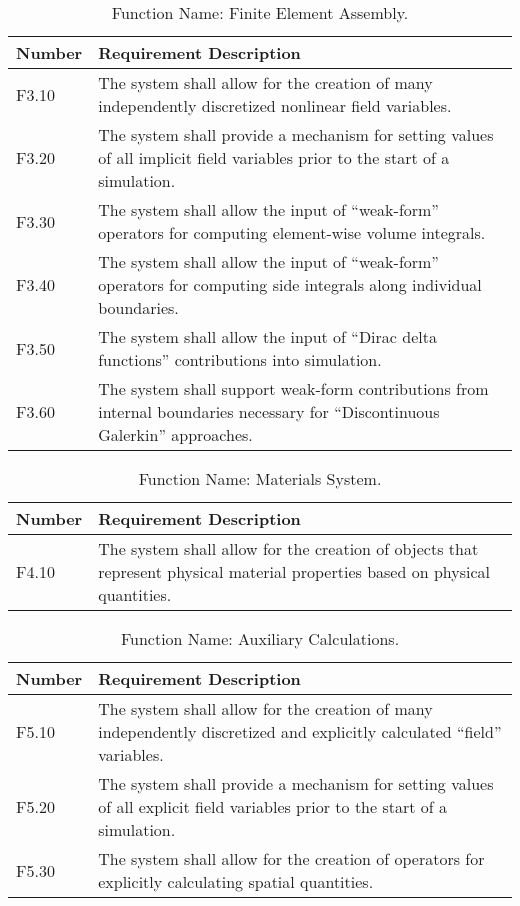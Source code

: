 \documentclass{INLreport}
\begin{document}
\begin{table}[!htbp]
  \caption{Function Name: Finite Element Assembly.\label{tab:fem}}
  \begin{tabular}{|l|p{12cm}|}
    \rowcolor{gray}
    Number & Requirement Description \\ \hline
    F3.10 & The system shall allow for the creation of many independently discretized nonlinear field variables. \\ \hline
    F3.20 & The system shall provide a mechanism for setting values of all implicit field variables prior to the start of a simulation. \\ \hline
    F3.30 & The system shall allow the input of ``weak-form'' operators for computing element-wise volume integrals. \\ \hline
    F3.40 & The system shall allow the input of ``weak-form'' operators for computing side integrals along individual boundaries. \\ \hline
    F3.50 & The system shall allow the input of ``Dirac delta functions'' contributions into simulation. \\ \hline
    F3.60 & The system shall support weak-form contributions from internal boundaries necessary for ``Discontinuous Galerkin'' approaches. \\ \hline
  \end{tabular}
\end{table}

\begin{table}[!htbp]
  \caption{Function Name: Materials System.\label{tab:mat}}
  \begin{tabular}{|l|p{12cm}|}
    \rowcolor{gray}
    Number & Requirement Description \\ \hline
    F4.10 & The system shall allow for the creation of objects that represent physical material properties based on physical quantities. \\ \hline
  \end{tabular}
\end{table}


\begin{table}[!htbp]
  \caption{Function Name: Auxiliary Calculations.\label{tab:aux}}
  \begin{tabular}{|l|p{12cm}|}
    \rowcolor{gray}
    Number & Requirement Description \\ \hline
    F5.10 & The system shall allow for the creation of many independently discretized and explicitly calculated ``field'' variables. \\ \hline
    F5.20 & The system shall provide a mechanism for setting values of all explicit field variables prior to the start of a simulation. \\ \hline
    F5.30 & The system shall allow for the creation of operators for explicitly calculating spatial quantities. \\ \hline
  \end{tabular}
\end{table}
\end{document}
